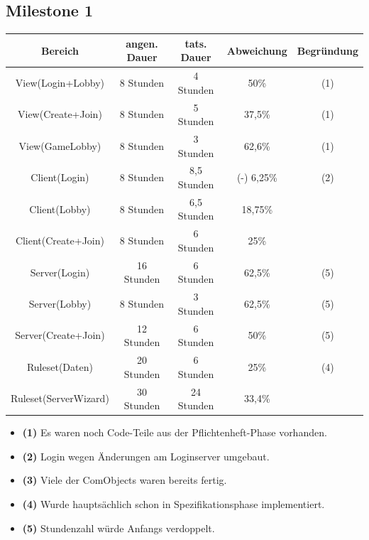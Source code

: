 \documentclass{article}
\begin{document}
\subsection{Milestone 1}

\begin{tabular}{|c|c|c|c|c|}\hline
   Bereich & angen. Dauer & tats. Dauer & Abweichung & Begründung \\ \hline\hline
   View(Login+Lobby) & 8 Stunden & 4 Stunden & 50\% & (1) \\ \hline
   View(Create+Join) & 8 Stunden & 5 Stunden & 37,5\% & (1)\\ \hline
   View(GameLobby) & 8 Stunden & 3 Stunden & 62,6\% & (1)\\ \hline
   Client(Login) & 8 Stunden & 8,5 Stunden & (-) 6,25\% & (2) \\ \hline
   Client(Lobby) & 8 Stunden &  6,5 Stunden & 18,75\% &\\ \hline
   Client(Create+Join) &  8 Stunden & 6 Stunden & 25\% &\\ \hline
   Server(Login) & 16 Stunden & 6 Stunden & 62,5\% & (5) \\ \hline
   Server(Lobby) & 8 Stunden & 3 Stunden & 62,5\% & (5)\\ \hline 
   Server(Create+Join) & 12 Stunden & 6 Stunden & 50\% & (5)\\ \hline 
   Ruleset(Daten) & 20 Stunden & 6 Stunden & 25\% & (4) \\ \hline 
   Ruleset(ServerWizard) & 30 Stunden & 24 Stunden & 33,4\% &\\ \hline 
 \end{tabular}

\begin{itemize}
\item \textbf{(1)} Es waren noch Code-Teile aus der Pflichtenheft-Phase vorhanden. \\
\item \textbf{(2)} Login wegen Änderungen am Loginserver umgebaut. \\
\item \textbf{(3)} Viele der ComObjects waren bereits fertig. \\
\item \textbf{(4)} Wurde hauptsächlich schon in Spezifikationsphase implementiert. \\
\item \textbf{(5)} Stundenzahl würde Anfangs verdoppelt. \\
\end{itemize}
\end{document}
